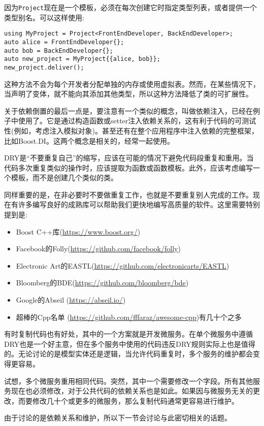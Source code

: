 因为\texttt{Project}现在是一个模板，必须在每次创建它时指定类型列表，或者提供一个类型别名。可以这样使用:

\begin{lstlisting}[style=styleCXX]
using MyProject = Project<FrontEndDeveloper, BackEndDeveloper>;
auto alice = FrontEndDeveloper{};
auto bob = BackEndDeveloper{};
auto new_project = MyProject{{alice, bob}};
new_project.deliver();
\end{lstlisting}

这种方法不会为每个开发者分配单独的内存或使用虚拟表。然而，在某些情况下，当声明了变体，就不能向其添加其他类型，所以这种方法降低了类的可扩展性。

关于依赖倒置的最后一点是，要注意有一个类似的概念，叫做依赖注入，已经在例子中使用了。它是通过构造函数或setter注入依赖关系的，这有利于代码的可测试性(例如，考虑注入模拟对象)。甚至还有在整个应用程序中注入依赖的完整框架，比如Boost.DI。这两个概念是相关的，经常一起使用。


DRY是“不要重复自己”的缩写，应该在可能的情况下避免代码段重复和重用。当代码多次重复类似的操作时，应该提取为函数或函数模板。此外，应该考虑编写一个模板，而不是创建几个类似的类。

同样重要的是，在非必要时不要做重复工作，也就是不要重复别人完成的工作。现在有许多编写良好的成熟库可以帮助我们更快地编写高质量的软件。这里需要特别提到是:

\begin{itemize}
\item Boost C++库(\url{https://www.boost.org/})
\item Facebook的Folly(\url{https://github.com/facebook/folly})
\item Electronic Art的EASTL(\url{https://github.com/electronicarts/EASTL})
\item Bloomberg的BDE(\url{https://github.com/bloomberg/bde})
\item Google的Abseil (\url{https://abseil.io/})
\item 超棒的Cpp名单 (\url{https://github.com/fffaraz/awesome-cpp})有几十个之多

\end{itemize}

有时复制代码也有好处，其中的一个方案就是开发微服务。在单个微服务中遵循DRY也是一个好主意，但在多个服务中使用的代码违反DRY规则实际上也是值得的。无论讨论的是模型实体还是逻辑，当允许代码重复时，多个服务的维护都会变得更容易。

试想，多个微服务重用相同代码。突然，其中一个需要修改一个字段。所有其他服务现在也必须修改，对于公共代码的依赖关系也是如此。如果因与微服务无关的更改，而要修改几十个或更多的微服务，那么复制代码通常更容易进行维护。

由于讨论的是依赖关系和维护，所以下一节会讨论与此密切相关的话题。








